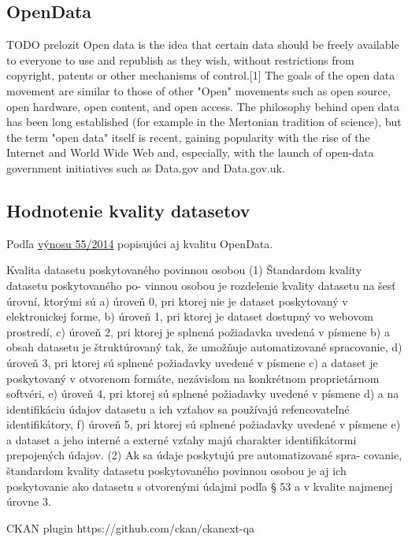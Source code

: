 \documentclass[12pt,a4paper]{article}
\begin{document}
\subsection{OpenData} 
\label{opendata} 
TODO prelozit 
Open data is the idea that certain data should be freely available to everyone to use and republish as they wish, without restrictions from copyright, patents or other mechanisms of control.[1] The goals of the open data movement are similar to those of other "Open" movements such as open source, open hardware, open content, and open access. The philosophy behind open data has been long established (for example in the Mertonian tradition of science), but the term "open data" itself is recent, gaining popularity with the rise of the Internet and World Wide Web and, especially, with the launch of open-data government initiatives such as Data.gov and Data.gov.uk.


\subsection{Hodnotenie kvality datasetov}
\label{zakon-kvalita} 
Podľa \href{http://www.zbierka.sk/sk/predpisy/55-2014-z-z.p-35621.pdf}{výnosu 55/2014} popisujúci aj kvalitu OpenData. 

Kvalita datasetu poskytovaného povinnou osobou
(1) Štandardom kvality datasetu poskytovaného po-
vinnou osobou je rozdelenie kvality datasetu na šesť
úrovní, ktorými sú
a) úroveň 0, pri ktorej nie je dataset poskytovaný
v elektronickej forme,
b) úroveň 1, pri ktorej je dataset dostupný vo webovom
prostredí,
c) úroveň 2, pri ktorej je splnená požiadavka uvedená
v písmene b) a obsah datasetu je štruktúrovaný tak,
že umožňuje automatizované spracovanie,
d) úroveň 3, pri ktorej sú splnené požiadavky uvedené
v písmene c) a dataset je poskytovaný v otvorenom
formáte, nezávislom na konkrétnom proprietárnom
softvéri,
e) úroveň 4, pri ktorej sú splnené požiadavky uvedené
v písmene d) a na identifikáciu údajov datasetu a ich
vzťahov sa používajú refencovateľné identifikátory,
f) úroveň 5, pri ktorej sú splnené požiadavky uvedené
v písmene e) a dataset a jeho interné a externé
vzťahy majú charakter identifikátormi prepojených
údajov.
(2) Ak sa údaje poskytujú pre automatizované spra-
covanie, štandardom kvality datasetu poskytovaného
povinnou osobou je aj ich poskytovanie ako datasetu
s otvorenými údajmi podľa § 53 a v kvalite najmenej
úrovne 3.

CKAN plugin 
https://github.com/ckan/ckanext-qa
\end{document}
